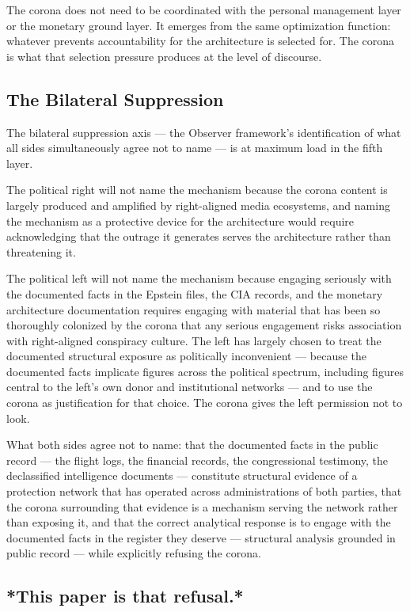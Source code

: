 \documentclass[11pt,a4paper]{article}
\begin{document}
The corona does not need to be coordinated with the personal management layer or the monetary ground layer. It emerges from the same optimization function: whatever prevents accountability for the architecture is selected for. The corona is what that selection pressure produces at the level of discourse.


\subsection{The Bilateral Suppression}

The bilateral suppression axis — the Observer framework's identification of what all sides simultaneously agree not to name — is at maximum load in the fifth layer.


The political right will not name the mechanism because the corona content is largely produced and amplified by right-aligned media ecosystems, and naming the mechanism as a protective device for the architecture would require acknowledging that the outrage it generates serves the architecture rather than threatening it.


The political left will not name the mechanism because engaging seriously with the documented facts in the Epstein files, the CIA records, and the monetary architecture documentation requires engaging with material that has been so thoroughly colonized by the corona that any serious engagement risks association with right-aligned conspiracy culture. The left has largely chosen to treat the documented structural exposure as politically inconvenient — because the documented facts implicate figures across the political spectrum, including figures central to the left's own donor and institutional networks — and to use the corona as justification for that choice. The corona gives the left permission not to look.


What both sides agree not to name: that the documented facts in the public record — the flight logs, the financial records, the congressional testimony, the declassified intelligence documents — constitute structural evidence of a protection network that has operated across administrations of both parties, that the corona surrounding that evidence is a mechanism serving the network rather than exposing it, and that the correct analytical response is to engage with the documented facts in the register they deserve — structural analysis grounded in public record — while explicitly refusing the corona.


\subsection{*This paper is that refusal.*}
\end{document}

